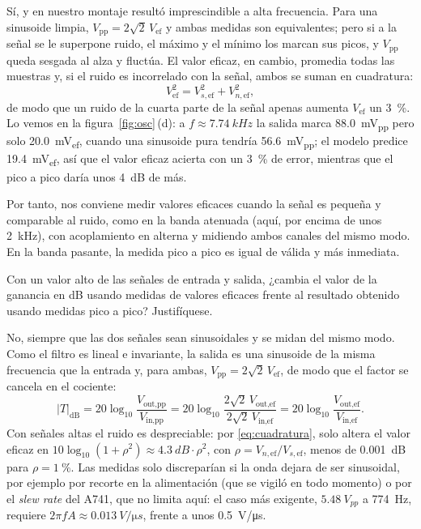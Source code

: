\documentclass[a4paper,11pt]{article}
\newcommand{\pp}{\text{pp}}
\newcommand{\ef}{\text{ef}}
\newcommand{\uA}{\textmu A741}
\begin{document}
Sí, y en nuestro montaje resultó imprescindible a alta frecuencia. Para una sinusoide limpia, $V_{\pp}=2\sqrt{2}\,V_{\ef}$ y ambas medidas son equivalentes; pero si a la señal se le superpone ruido, el máximo y el mínimo los marcan sus picos, y $V_{\pp}$ queda sesgada al alza y fluctúa. El valor eficaz, en cambio, promedia todas las muestras y, si el ruido es incorrelado con la señal, ambos se suman en cuadratura:
\begin{equation}
  V_{\ef}^2=V_{s,\ef}^2+V_{n,\ef}^2 ,
  \label{eq:cuadratura}
\end{equation}
de modo que un ruido de la cuarta parte de la señal apenas aumenta $V_{\ef}$ un \qty{3}{\percent}. Lo vemos en la figura~\ref{fig:osc}\,(d): a $f\approx\qty{7.74}{kHz}$ la salida marca \qty{88.0}{mV_{pp}} pero solo \qty{20.0}{mV_{ef}}, cuando una sinusoide pura tendría \qty{56.6}{mV_{pp}}; el modelo predice \qty{19.4}{mV_{ef}}, así que el valor eficaz acierta con un \qty{3}{\percent} de error, mientras que el pico a pico daría unos \qty{4}{dB} de más.

Por tanto, nos conviene medir valores eficaces cuando la señal es pequeña y comparable al ruido, como en la banda atenuada (aquí, por encima de unos \qty{2}{kHz}), con acoplamiento en alterna y midiendo ambos canales del mismo modo. En la banda pasante, la medida pico a pico es igual de válida y más inmediata.

\begin{pregunta}
Con un valor alto de las señales de entrada y salida, ¿cambia el valor de la ganancia en dB usando medidas de valores eficaces frente al resultado obtenido usando medidas pico a pico? Justifíquese.
\end{pregunta}

No, siempre que las dos señales sean sinusoidales y se midan del mismo modo. Como el filtro es lineal e invariante, la salida es una sinusoide de la misma frecuencia que la entrada y, para ambas, $V_{\pp}=2\sqrt2\,V_{\ef}$, de modo que el factor se cancela en el cociente:
\begin{equation}
  |T|_{\text{dB}}
  =20\log_{10}\frac{V_{\text{out},\pp}}{V_{\text{in},\pp}}
  =20\log_{10}\frac{2\sqrt2\,V_{\text{out},\ef}}{2\sqrt2\,V_{\text{in},\ef}}
  =20\log_{10}\frac{V_{\text{out},\ef}}{V_{\text{in},\ef}} .
\end{equation}
Con señales altas el ruido es despreciable: por \eqref{eq:cuadratura}, solo altera el valor eficaz en $10\log_{10}(1+\rho^2)\approx\qty{4.3}{dB}\cdot\rho^2$, con $\rho=V_{n,\ef}/V_{s,\ef}$, menos de \qty{0.001}{dB} para $\rho=\qty{1}{\percent}$. Las medidas solo discreparían si la onda dejara de ser sinusoidal, por ejemplo por recorte en la alimentación (que se vigiló en todo momento) o por el \emph{slew rate} del \uA{}, que no limita aquí: el caso más exigente, $\qty{5.48}{V_{pp}}$ a \qty{774}{Hz}, requiere $2\pi fA\approx\qty{0.013}{V/\micro s}$, frente a unos \qty{0.5}{V/\micro s}.
\end{document}
